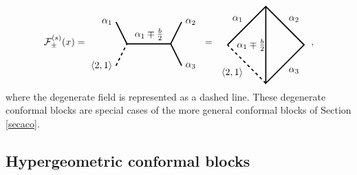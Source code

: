 \documentclass[12pt, a4paper, notitlepage, twoside]{report}
\numberwithin{equation}{section}
\theoremstyle{break}
\begin{document}
\begin{align}
 \mathcal{F}^{(s)}_\pm(x)  =  
 \begin{tikzpicture}[baseline=(current  bounding  box.center), very thick, scale = .4]
\draw (-1,2) node [left] {$\alpha_1$} -- (0,0) -- node [above] {$\alpha_1\mp \frac{b}{2}$} (4,0) -- (5,2) node [right] {$\alpha_2$};
\draw[dashed] (-1,-2) node [left] {$\langle 2,1 \rangle$} -- (0,0);
\draw (4,0) -- (5,-2) node [right] {$\alpha_3$};
\end{tikzpicture}
\ =\ 
\begin{tikzpicture}[baseline=(current  bounding  box.center), very thick, scale = .7]
\draw[dashed] (0, -2) -- node [below left] {$\langle 2,1 \rangle$} (-2, 0); 
\draw (-2, 0) -- node [above left] {$\alpha_1$} (0, 2) -- node [above right] {$\alpha_2$} (2, 0) -- node [below right] {$\alpha_3$} (0, -2) -- node [left] {$\alpha_1\mp \frac{b}{2}\! \! $} (0, 2); 
\end{tikzpicture}
\  \ ,
\label{gpic}
\end{align}
where the degenerate field is represented as a dashed line.
These degenerate conformal blocks are special cases of the more general conformal blocks of Section \ref{secaco}.


\subsection{Hypergeometric conformal blocks \label{sechcb}}
\end{document}
